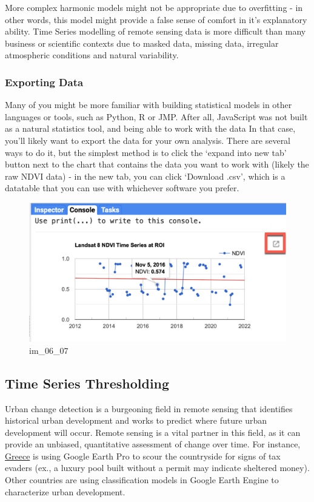 \documentclass[
]{article}
\begin{document}
More complex harmonic models might not be appropriate due to overfitting - in other words, this model might provide a false sense of comfort in it's explanatory ability. Time Series modelling of remote sensing data is more difficult than many business or scientific contexts due to masked data, missing data, irregular atmospheric conditions and natural variability.

\hypertarget{exporting-data}{%
\subsubsection{Exporting Data}\label{exporting-data}}

Many of you might be more familiar with building statistical models in other languages or tools, such as Python, R or JMP. After all, JavaScript was not built as a natural statistics tool, and being able to work with the data In that case, you'll likely want to export the data for your own analysis. There are several ways to do it, but the simplest method is to click the `expand into new tab' button next to the chart that contains the data you want to work with (likely the raw NDVI data) - in the new tab, you can click `Download .csv', which is a datatable that you can use with whichever software you prefer.

\begin{figure}
\centering
\includegraphics{./im/im_06_07.png}
\caption{im\_06\_07}
\end{figure}

\hypertarget{time-series-thresholding}{%
\subsection{Time Series Thresholding}\label{time-series-thresholding}}

Urban change detection is a burgeoning field in remote sensing that identifies historical urban development and works to predict where future urban development will occur. Remote sensing is a vital partner in this field, as it can provide an unbiased, quantitative assessment of change over time. For instance, \href{https://www.spiegel.de/international/europe/finding-swimming-pools-with-google-earth-greek-government-hauls-in-billions-in-back-taxes-a-709703.html}{Greece} is using Google Earth Pro to scour the countryside for signs of tax evaders (ex., a luxury pool built without a permit may indicate sheltered money). Other countries are using classification models in Google Earth Engine to characterize urban development.
\end{document}
